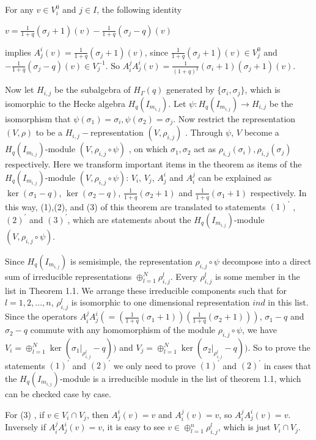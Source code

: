 \def\CTEXPreproc{Created by ctex v0.2.12, don't edit!}\documentclass[11pt]{article}
\begin{document}
\begin{pf}
For any $v\in V^{0} _i $ and $j\in I$, the following identity

$ v=  \frac{1}{1+q} (\sigma_j +1)(v)-\frac{1}{1+q}(\sigma_j -q)(v)  $

implies $A^{i}_{j} (v) = \frac{1}{1+q} (\sigma_j +1)(v)$, since $ \frac{1}{1+q} (\sigma_j +1)(v)\in V^{0}_j    $ and
$-\frac{1}{1+q}(\sigma_j -q)(v) \in V^{-1} _j $. So
 $A^{j} _i A^{i} _j (v) =\frac{1}{(1+q)^2 } ( \sigma_i +1  )(\sigma_j +1)(v)  $.

Now let $H_{i,j} $ be the subalgebra of $H_{\Gamma}(q)$ generated by $ \{  \sigma_i , \sigma_j  \}  $, which is isomorphic to the
Hecke algebra $H_q (I_{m_{i,j}})$. Let $\psi: H_q (I_{m_{i,j}})\rightarrow H_{i,j} $ be the isomorphism that
$\psi(\sigma_1 )= \sigma_i ,\psi(\sigma_2 )= \sigma_j $. Now restrict the representation
$(V,\rho )$ to be a $H_{i,j}-$representation   $(V, \rho_{i,j}   )$ . Through $\psi$, $V$ become a $H_q (I_{m_{i,j}})$-module $( V,\rho_{i,j}\circ \psi  )$   , on which
$\sigma_1 ,\sigma_2$ act as $\rho_{i,j} (\sigma_i ) ,\rho_{i,j} (\sigma_j)  $ respectively. Here we transform important items in the theorem as items of the $H_q (I_{m_{i,j}})$-module $( V,\rho_{i,j}\circ \psi  )$:   $V_i$, $V_j$, $A^i _j$ and  $A^j _i$ can be explained as
 $\ker(\sigma_1 -q)$, $\ker(\sigma_2 -q)$, $\frac{1}{1+q}(\sigma_2 +1)$ and $ \frac{1}{1+q}(\sigma_1 +1) $ respectively.
 In this way, (1),(2), and (3) of this theorem are translated to statements $(1)^{'} $ , $(2)^{'} $ and $(3)^{'}$, which are statements about  the $H_q (I_{m_{i,j}})$-module $( V,\rho_{i,j}\circ \psi  )$.

 Since $ H_q (I_{m_{i,j}}) $ is semisimple, the representation $\rho_{i,j}\circ \psi$ decompose into a direct sum of irreducible representations $\oplus ^{N} _{l=1} \rho ^{l} _{i,j}$. Every $\rho ^{l} _{i,j}$ is some member in the list in Theorem 1.1. We arrange
 these irreducible components such that for $l=1,2,..., n$,  $\rho ^{l} _{i,j}$ is isomorphic to one dimensional representation $ind$ in this list. Since the operators  $A^{j} _i A^{i} _j (= (\frac{1}{1+q}(\sigma_1 +1) )(\frac{1}{1+q}(\sigma_2 +1)) )$,  $\sigma_1 -q$ and $\sigma_2 -q $  commute with any homomorphism of the module $ \rho_{i,j}\circ \psi $, we have $V_i = \oplus^{N} _{l=1} \ker( \sigma_1 |_{ \rho^{l} _{i,j}} -q )   )  $ and  $V_j = \oplus^{N} _{l=1} \ker( \sigma_2 |_{ \rho^{l} _{i,j}} -q )   )  $. So to prove the statements $(1)^{'}$ and $(2)^{'}$ we only need to prove  $(1)^{'}$ and $(2)^{'}$ in cases that the $H_q (I_{m_{i,j}})$-module is a irreducible module in the list of theorem 1.1, which can be checked case by case.


 For (3) , if $v\in V_i \cap V_j $, then $ A^i _j (v)=v   $ and $A^j _i (v) =v $, so $A^{j} _i A^{i} _j (v)=v$.  Inversely if $A^{j} _i A^{i} _j (v)=v$,  it is easy to see $v\in \oplus^{n} _{l=1} \rho ^{l} _{i,j}  $,   which is just  $V_i \cap V_j $. \\


\end{pf}
\end{document}
